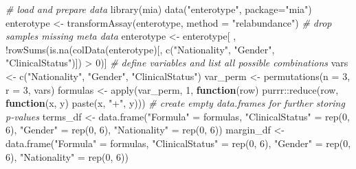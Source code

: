 \documentclass[
]{book}
\newenvironment{Shaded}{\begin{snugshade}}{\end{snugshade}}
\newcommand{\AttributeTok}[1]{\textcolor[rgb]{0.77,0.63,0.00}{#1}}
\newcommand{\CommentTok}[1]{\textcolor[rgb]{0.56,0.35,0.01}{\textit{#1}}}
\newcommand{\ControlFlowTok}[1]{\textcolor[rgb]{0.13,0.29,0.53}{\textbf{#1}}}
\newcommand{\DecValTok}[1]{\textcolor[rgb]{0.00,0.00,0.81}{#1}}
\newcommand{\FunctionTok}[1]{\textcolor[rgb]{0.00,0.00,0.00}{#1}}
\newcommand{\NormalTok}[1]{#1}
\newcommand{\OtherTok}[1]{\textcolor[rgb]{0.56,0.35,0.01}{#1}}
\newcommand{\SpecialCharTok}[1]{\textcolor[rgb]{0.00,0.00,0.00}{#1}}
\newcommand{\StringTok}[1]{\textcolor[rgb]{0.31,0.60,0.02}{#1}}
\begin{document}
\begin{Shaded}
\begin{Highlighting}[]
\CommentTok{\# load and prepare data}
\FunctionTok{library}\NormalTok{(mia)}
\FunctionTok{data}\NormalTok{(}\StringTok{"enterotype"}\NormalTok{, }\AttributeTok{package=}\StringTok{"mia"}\NormalTok{)}
\NormalTok{enterotype }\OtherTok{\textless{}{-}} \FunctionTok{transformAssay}\NormalTok{(enterotype, }\AttributeTok{method =} \StringTok{"relabundance"}\NormalTok{)}
\CommentTok{\# drop samples missing meta data}
\NormalTok{enterotype }\OtherTok{\textless{}{-}}\NormalTok{ enterotype[ , }\SpecialCharTok{!}\FunctionTok{rowSums}\NormalTok{(}\FunctionTok{is.na}\NormalTok{(}\FunctionTok{colData}\NormalTok{(enterotype)[, }\FunctionTok{c}\NormalTok{(}\StringTok{"Nationality"}\NormalTok{, }\StringTok{"Gender"}\NormalTok{, }\StringTok{"ClinicalStatus"}\NormalTok{)]) }\SpecialCharTok{\textgreater{}} \DecValTok{0}\NormalTok{)]}
\CommentTok{\# define variables and list all possible combinations}
\NormalTok{vars }\OtherTok{\textless{}{-}} \FunctionTok{c}\NormalTok{(}\StringTok{"Nationality"}\NormalTok{, }\StringTok{"Gender"}\NormalTok{, }\StringTok{"ClinicalStatus"}\NormalTok{)}
\NormalTok{var\_perm }\OtherTok{\textless{}{-}} \FunctionTok{permutations}\NormalTok{(}\AttributeTok{n =} \DecValTok{3}\NormalTok{, }\AttributeTok{r =} \DecValTok{3}\NormalTok{, vars)}
\NormalTok{formulas }\OtherTok{\textless{}{-}} \FunctionTok{apply}\NormalTok{(var\_perm, }\DecValTok{1}\NormalTok{, }\ControlFlowTok{function}\NormalTok{(row) purrr}\SpecialCharTok{::}\FunctionTok{reduce}\NormalTok{(row, }\ControlFlowTok{function}\NormalTok{(x, y) }\FunctionTok{paste}\NormalTok{(x, }\StringTok{"+"}\NormalTok{, y)))}
\CommentTok{\# create empty data.frames for further storing p{-}values}
\NormalTok{terms\_df }\OtherTok{\textless{}{-}} \FunctionTok{data.frame}\NormalTok{(}\StringTok{"Formula"} \OtherTok{=}\NormalTok{ formulas,}
                       \StringTok{"ClinicalStatus"} \OtherTok{=} \FunctionTok{rep}\NormalTok{(}\DecValTok{0}\NormalTok{, }\DecValTok{6}\NormalTok{),}
                       \StringTok{"Gender"} \OtherTok{=} \FunctionTok{rep}\NormalTok{(}\DecValTok{0}\NormalTok{, }\DecValTok{6}\NormalTok{),}
                       \StringTok{"Nationality"} \OtherTok{=} \FunctionTok{rep}\NormalTok{(}\DecValTok{0}\NormalTok{, }\DecValTok{6}\NormalTok{))}
\NormalTok{margin\_df }\OtherTok{\textless{}{-}} \FunctionTok{data.frame}\NormalTok{(}\StringTok{"Formula"} \OtherTok{=}\NormalTok{ formulas,}
                        \StringTok{"ClinicalStatus"} \OtherTok{=} \FunctionTok{rep}\NormalTok{(}\DecValTok{0}\NormalTok{, }\DecValTok{6}\NormalTok{),}
                        \StringTok{"Gender"} \OtherTok{=} \FunctionTok{rep}\NormalTok{(}\DecValTok{0}\NormalTok{, }\DecValTok{6}\NormalTok{),}
                        \StringTok{"Nationality"} \OtherTok{=} \FunctionTok{rep}\NormalTok{(}\DecValTok{0}\NormalTok{, }\DecValTok{6}\NormalTok{))}
\end{Highlighting}
\end{Shaded}
\end{document}
